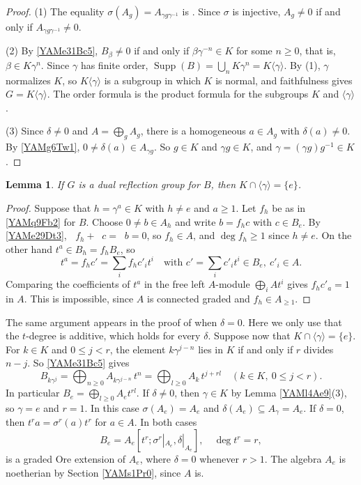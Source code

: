 \documentclass[reqno]{amsart}
\numberwithin{equation}{section}
\newtheorem{lemma}[equation]{Lemma}
\theoremstyle{definition}
\theoremstyle{remark}
\theoremstyle{plain}
\DeclareMathOperator{\supp}{Supp}
\DeclareMathOperator{\degt}{deg_t}
\begin{document}
\begin{proof}
(1) The equality $\sigma(A_g)=A_{\gamma g\gamma^{-1}}$ is \cite[Lemma 2.3(3)]{AM2}. Since $\sigma$ is injective, $A_g\neq0$ if and only if $A_{\gamma g\gamma^{-1}}\neq0$.

(2) By \eqref{YAMe31Bc5}, $B_\beta\neq0$ if and only if $\beta\gamma^{-n}\in K$ for some $n\ge0$, that is, $\beta\in K\gamma^n$. Since $\gamma$ has finite order, $\supp(B)=\bigcup_nK\gamma^n=K\langle\gamma\rangle$. By (1), $\gamma$ normalizes $K$, so $K\langle\gamma\rangle$ is a subgroup in which $K$ is normal, and faithfulness gives $G=K\langle\gamma\rangle$. The order formula is the product formula for the subgroups $K$ and $\langle\gamma\rangle$.

(3) Since $\delta\neq0$ and $A=\bigoplus_gA_g$, there is a homogeneous $a\in A_g$ with $\delta(a)\neq0$. By \eqref{YAMg6Tw1}, $0\neq\delta(a)\in A_{\gamma g}$. So $g\in K$ and $\gamma g\in K$, and $\gamma=(\gamma g)g^{-1}\in K$.
\end{proof}

\begin{lemma}\label{YAMi6Ub2}
If $G$ is a dual reflection group for $B$, then $K\cap\langle\gamma\rangle=\{e\}$.
\end{lemma}

\begin{proof}
Suppose that $h=\gamma^a\in K$ with $h\neq e$ and $a\ge1$. Let $f_h$ be as in \eqref{YAMq9Fb2} for $B$. Choose $0\neq b\in A_h$ and write $b=f_hc$ with $c\in B_e$. By \eqref{YAMe29Dt3}, $\degt f_h+\degt c=\degt b=0$, so $f_h\in A$, and $\deg f_h\ge1$ since $h\neq e$. On the other hand $t^a\in B_h=f_hB_e$, so
\[
t^a=f_hc'=\sum_if_hc'_it^i\quad\text{with }c'=\sum_ic'_it^i\in B_e,\ c'_i\in A.
\]
Comparing the coefficients of $t^a$ in the free left $A$-module $\bigoplus_iAt^i$ gives $f_hc'_a=1$ in $A$. This is impossible, since $A$ is connected graded and $f_h\in A_{\ge1}$.
\end{proof}

The same argument appears in the proof of \cite[Proposition 6.1]{BR} when $\delta=0$. Here we only use that the $t$-degree is additive, which holds for every $\delta$. Suppose now that $K\cap\langle\gamma\rangle=\{e\}$. For $k\in K$ and $0\le j<r$, the element $k\gamma^{j-n}$ lies in $K$ if and only if $r$ divides $n-j$. So \eqref{YAMe31Bc5} gives
\begin{equation}\label{YAMe76Cp4}
B_{k\gamma^j}=\bigoplus_{n\ge0}A_{k\gamma^{j-n}}\,t^n=\bigoplus_{l\ge0}A_k\,t^{j+rl}\quad(k\in K,\ 0\le j<r).
\end{equation}
In particular $B_e=\bigoplus_{l\ge0}A_et^{rl}$. If $\delta\neq0$, then $\gamma\in K$ by Lemma \ref{YAMl4Ae9}(3), so $\gamma=e$ and $r=1$. In this case $\sigma(A_e)=A_e$ and $\delta(A_e)\subseteq A_{\gamma}=A_e$. If $\delta=0$, then $t^ra=\sigma^r(a)t^r$ for $a\in A$. In both cases
\begin{equation}\label{YAMe34Be8}
B_e=A_e[t^r;\sigma^r|_{A_e},\delta|_{A_e}],\quad\deg t^r=r,
\end{equation}
is a graded Ore extension of $A_e$, where $\delta=0$ whenever $r>1$. The algebra $A_e$ is noetherian by Section \ref{YAMs1Pr0}, since $A$ is.
\end{document}
